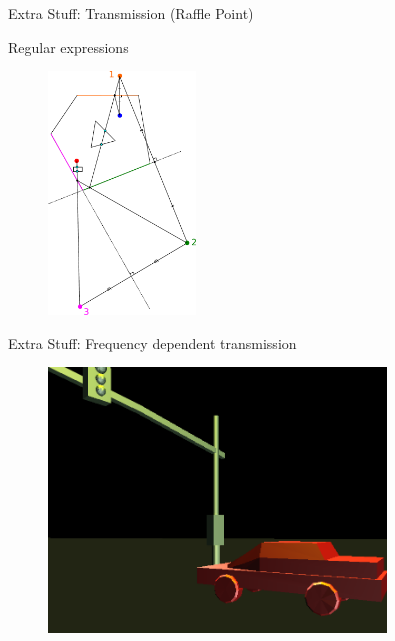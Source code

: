\documentclass{beamer}
\begin{document}
\begin{frame}{Extra Stuff: Transmission (Raffle Point)}

Regular expressions 

\begin{figure}[t]
\centering
\includegraphics[width=0.35\textwidth]{ImageSources2MultiDrawn4_Transmission.pdf}
\end{figure}



\end{frame}

\begin{frame}{Extra Stuff: Frequency dependent transmission}

\begin{figure}[t]
\centering
\includegraphics[width=0.8\textwidth]{outsidecar.png}
\end{figure}


\end{frame}
\end{document}
